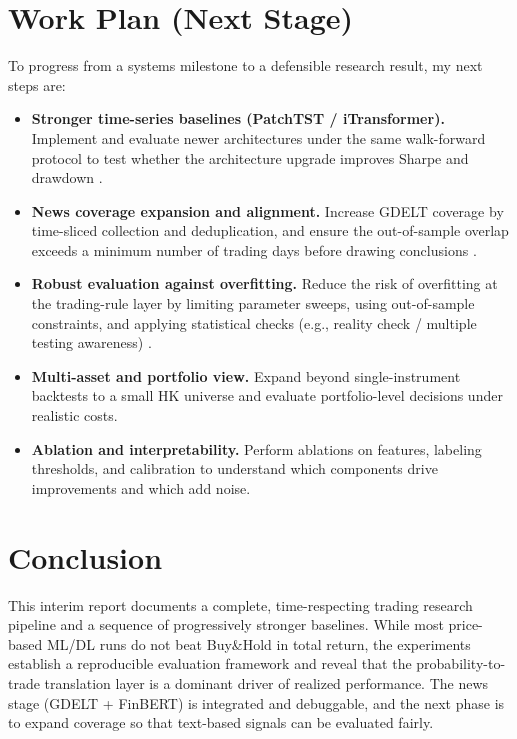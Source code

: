 \documentclass[12pt,a4paper,oneside]{report}
\begin{document}
\chapter{Work Plan (Next Stage)}
To progress from a systems milestone to a defensible research result, my next steps are:
\begin{itemize}
  \item \textbf{Stronger time-series baselines (PatchTST / iTransformer).} Implement and evaluate newer architectures under the same walk-forward protocol to test whether the architecture upgrade improves Sharpe and drawdown \citep{patchtst2023,itransformer2024}.
  \item \textbf{News coverage expansion and alignment.} Increase GDELT coverage by time-sliced collection and deduplication, and ensure the out-of-sample overlap exceeds a minimum number of trading days before drawing conclusions \citep{leetaru2013gdelt,araci2019finbert}.
  \item \textbf{Robust evaluation against overfitting.} Reduce the risk of overfitting at the trading-rule layer by limiting parameter sweeps, using out-of-sample constraints, and applying statistical checks (e.g., reality check / multiple testing awareness) \citep{white2000,bailey2014}.
  \item \textbf{Multi-asset and portfolio view.} Expand beyond single-instrument backtests to a small HK universe and evaluate portfolio-level decisions under realistic costs.
  \item \textbf{Ablation and interpretability.} Perform ablations on features, labeling thresholds, and calibration to understand which components drive improvements and which add noise.
\end{itemize}

\chapter{Conclusion}
This interim report documents a complete, time-respecting trading research pipeline and a sequence of progressively stronger baselines. While most price-based ML/DL runs do not beat Buy\&Hold in total return, the experiments establish a reproducible evaluation framework and reveal that the probability-to-trade translation layer is a dominant driver of realized performance. The news stage (GDELT + FinBERT) is integrated and debuggable, and the next phase is to expand coverage so that text-based signals can be evaluated fairly.
\end{document}
